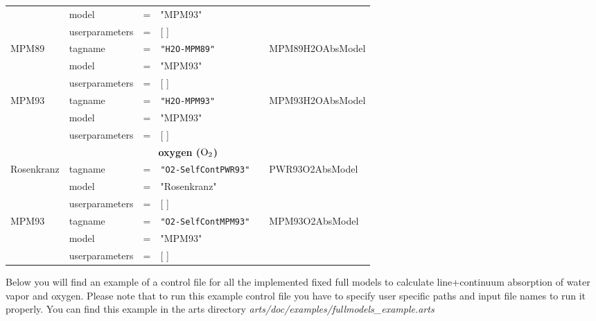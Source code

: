 {\begin{landscape}
\begin{longtable}{llllll}
             & model &=& "MPM93" &   &  \\ 
             & userparameters &=& [ ] &   & \\
 MPM89       & tagname &=& {\tt "H2O-MPM89"}   & \cite{liebe:89} & MPM89H2OAbsModel\\
             & model &=& "MPM93" &   &  \\ 
             & userparameters &=& [ ] &   & \\
 MPM93       & tagname &=& {\tt "H2O-MPM93"}   & \cite{liebeetal:93} & MPM93H2OAbsModel\\
             & model &=& "MPM93" &   &  \\ 
             & userparameters &=& [ ] &   & \\
 \hline
 \multicolumn{6}{c}{{\bf oxygen ($\mbox{O}_2$)}}\\
 \hline
 Rosenkranz  & tagname &=& {\tt "O2-SelfContPWR93"} & \cite{pwr:93} & PWR93O2AbsModel\\
             & model &=& "Rosenkranz" &   &  \\ 
             & userparameters &=& [ ] &   & \\
 MPM93       & tagname &=& {\tt "O2-SelfContMPM93"} & \cite{liebeetal:93} & MPM93O2AbsModel\\
             & model &=& "MPM93" &   &  \\ 
             & userparameters &=& [ ] &   & \\
 \hline
 \end{longtable}
 \setlength{\LTcapwidth}{0.8\textwidth}
\end{landscape}






\label{leveld:ArtsFullModelExampleControlFile}
Below you will find an example of a control file for all 
the implemented fixed full models to calculate line+continuum
absorption of water vapor and oxygen. Please note that to 
run this example control file you have to specify user 
specific paths and input file names to run it properly. 
You can find this example in the arts directory 
{\it arts/doc/examples/fullmodels\_example.arts}


}
